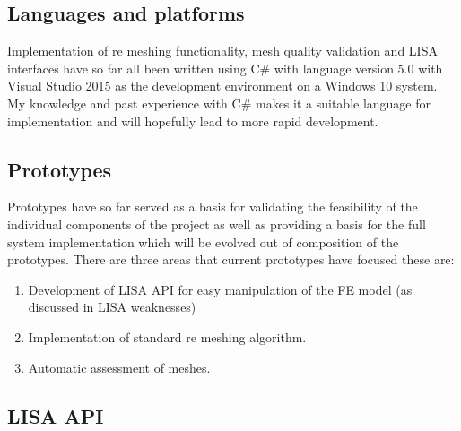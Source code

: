 \documentclass{article}
\begin{document}
\subsection{Languages and platforms}
Implementation of re meshing functionality, mesh quality validation and LISA interfaces have so far all been written using C\# with language version 5.0 with Visual Studio 2015 as the development environment on a Windows 10 system. My knowledge and past experience with C\# makes it a suitable language for implementation and will hopefully lead to more rapid development.

\subsection{Prototypes}
Prototypes have so far served as a basis for validating the feasibility of the individual components of the project as well as providing a basis for the full system implementation which will be evolved out of composition of the prototypes. There are three areas that current prototypes have focused these are:

\begin{enumerate}[label=\Alph*]
\item Development of LISA API for easy manipulation of the FE model (as discussed in LISA weaknesses)
\item Implementation of standard re meshing algorithm.
\item Automatic assessment of meshes.
\end{enumerate}

\subsection{LISA API}
\end{document}
